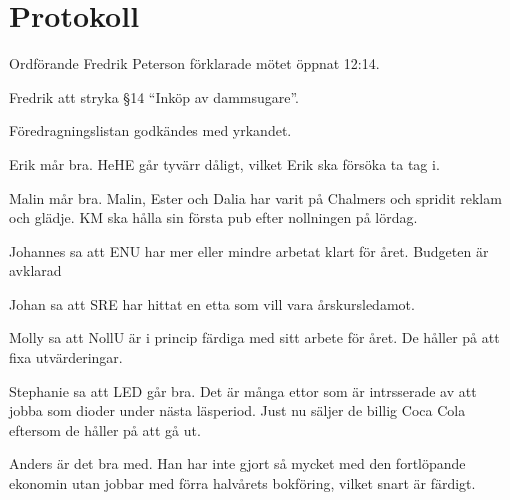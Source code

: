 \documentclass[10pt]{article}
\def\mo{Fredrik Peterson}
\begin{document}
\section*{Protokoll}
\begin{paragrafer}
Ordförande {\mo} förklarade mötet öppnat 12:14.

\valavmo

\valavms

\tosg

\ingaadj

\valavj

Fredrik \ypa att stryka \S14 ``Inköp av dammsugare''.

Föredragningslistan godkändes med yrkandet.

\begin{fyllnadsval} %
\end{fyllnadsval}


\begin{paragrafer}
Erik mår bra. HeHE går tyvärr dåligt, vilket Erik ska försöka ta tag i.

Malin mår bra. Malin, Ester och Dalia har varit på Chalmers och spridit reklam och glädje. KM ska hålla sin första pub efter nollningen på lördag.

Johannes sa att ENU har mer eller mindre arbetat klart för året. Budgeten är avklarad

Johan sa att SRE har hittat en etta som vill vara årskursledamot.

Molly sa att NollU är i princip färdiga med sitt arbete för året. De håller på att fixa utvärderingar.

Stephanie sa att LED går bra. Det är många ettor som är intrsserade av att jobba som dioder under nästa läsperiod. Just nu säljer de billig Coca Cola eftersom de håller på att gå ut.

Anders är det bra med. Han har inte gjort så mycket med den fortlöpande ekonomin utan jobbar med förra halvårets bokföring, vilket snart är färdigt.


\end{paragrafer}
\end{paragrafer}
\end{document}
